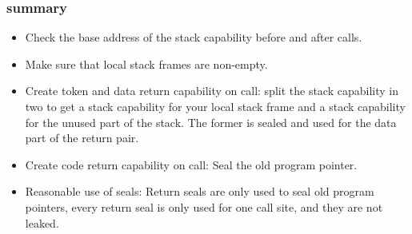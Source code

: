 \documentclass[aspectratio=169]{beamer}
\begin{document}


\begin{frame}
  \frametitle{\stktokens{} summary}
  \begin{itemize}
  \item<0> Check the base address of the stack capability before and after calls.
  \item<1> Make sure that local stack frames are non-empty.
  \item<0> Create token and data return capability on call: split the stack
    capability in two to get a stack capability for your local stack frame and a
    stack capability for the unused part of the stack. The former is sealed and
    used for the data part of the return pair.
  \item<0> Create code return capability on call: Seal the old program pointer.
  \item<2> Reasonable use of seals: Return seals are only used to seal old program
    pointers, every return seal is only used for one call site, and they are not
    leaked. %
  \end{itemize}
\end{frame}
\end{document}
